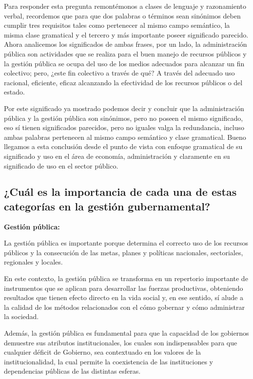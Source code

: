 \documentclass[
  a4paper,
]{article}
\begin{document}
Para responder esta pregunta remontémonos a clases de lenguaje y
razonamiento verbal, recordemos que para que dos palabras o términos
sean sinónimos deben cumplir tres requisitos tales como pertenecer al
mismo campo semántico, la misma clase gramatical y el tercero y más
importante poseer significado parecido. Ahora analicemos los
significados de ambas frases, por un lado, la administración pública son
actividades que se realiza para el buen manejo de recursos públicos y la
gestión pública se ocupa del uso de los medios adecuados para alcanzar
un fin colectivo; pero, ¿este fin colectivo a través de qué? A través
del adecuado uso racional, eficiente, eficaz alcanzando la efectividad
de los recursos públicos o del estado.

Por este significado ya mostrado podemos decir y concluir que la
administración pública y la gestión pública son sinónimos, pero no
poseen el mismo significado, eso sí tienen significados parecidos, pero
no iguales valga la redundancia, incluso ambas palabras pertenecen al
mismo campo semántico y clase gramatical. Bueno llegamos a esta
conclusión desde el punto de vista con enfoque gramatical de su
significado y uso en el área de economía, administración y claramente en
su significado de uso en el sector público.

\hypertarget{cuuxe1l-es-la-importancia-de-cada-una-de-estas-categoruxedas-en-la-gestiuxf3n-gubernamental}{%
\subsection{¿Cuál es la importancia de cada una de estas categorías en
la gestión
gubernamental?}\label{cuuxe1l-es-la-importancia-de-cada-una-de-estas-categoruxedas-en-la-gestiuxf3n-gubernamental}}

\textbf{Gestión pública:}

La gestión pública es importante porque determina el correcto uso de los
recursos públicos y la consecución de las metas, planes y políticas
nacionales, sectoriales, regionales y locales.

En este contexto, la gestión pública se transforma en un repertorio
importante de instrumentos que se aplican para desarrollar las fuerzas
productivas, obteniendo resultados que tienen efecto directo en la vida
social y, en ese sentido, sí alude a la calidad de los métodos
relacionados con el cómo gobernar y cómo administrar la sociedad.

Además, la gestión pública es fundamental para que la capacidad de los
gobiernos demuestre sus atributos institucionales, los cuales son
indispensables para que cualquier déficit de Gobierno, sea contextuado
en los valores de la institucionalidad, la cual permite la coexistencia
de las instituciones y dependencias públicas de las distintas esferas.
\end{document}
